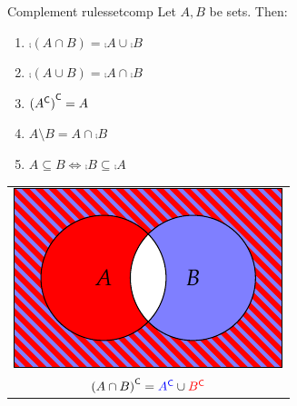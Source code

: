 \begin{thm}[lower separated=false, sidebyside, sidebyside align=top seam, sidebyside gap=0pt, righthand width=0.4\linewidth]{Complement rules}{setcomp}
	Let $A,B$ be sets. Then:
	\begin{enumerate}\itemsep0pt
		\item $\comp{(A\cap B)}=\comp A\cup \comp B$
		\item $\comp{(A\cup B)}=\comp A\cap \comp B$
		\item $\smash[t]{{({A}^{\mathsf{C}})}^{\mathsf{C}}}=A$
		\item $A\setminus B=A\cap\comp B$
		\item $A\subseteq B\iff \comp B\subseteq \comp A$
	\end{enumerate}
	\tcblower
	\flushright
	\begin{tabular}{c@{}}
		\includegraphics[scale=0.9]{sets-08-venndemorgan2}\\
		${(A\cap B)}^{\mathsf{C}}=\textcolor{blue}{{A}^{\mathsf{C}}}\cup \textcolor{red}{{B}^{\mathsf{C}}}$
	\end{tabular}
\end{thm}



